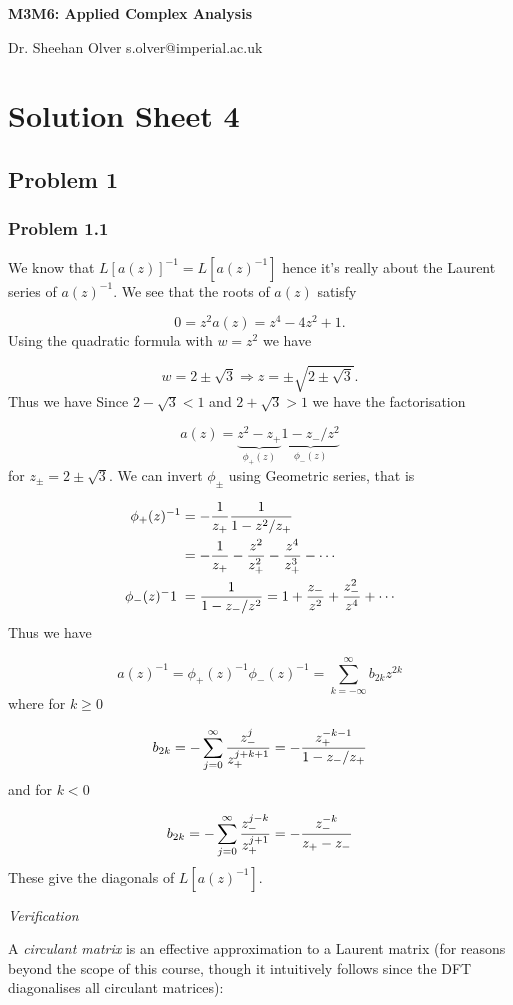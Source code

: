 \documentclass[12pt,a4paper]{article}
\def\addtab#1={#1\;&=}
\def\ccr{\\\addtab}
\def\addtab#1={#1\;&=}
\def\ccr{\\\addtab}
\begin{document}
\textbf{M3M6: Applied Complex Analysis}

Dr. Sheehan Olver s.olver@imperial.ac.uk

\section{Solution Sheet 4}
\subsection{Problem 1}
\subsubsection{Problem 1.1}
We know that $L[a(z)]^{-1} = L[a(z)^{-1}]$ hence it's really about the Laurent series of $a(z)^{-1}$. We see that the roots of $a(z)$ satisfy

\[
0 =z^2 a(z) = z^4 - 4z^2 + 1.
\]
Using the quadratic formula with $w = z^2$ we have

\[
w = 2 \pm \sqrt 3 \Rightarrow z = \pm \sqrt{2 \pm \sqrt 3}.
\]
Thus we have Since $2 - \sqrt 3 < 1$ and $2 + \sqrt 3 > 1$ we have the factorisation

\[
a(z) = \underbrace{z^2 - z_+}_{\phi_+(z)} \underbrace{1 - z_-/z^2}_{\phi_-(z)}
\]
for $z_{\pm} = 2 \pm \sqrt3$. We can invert $\phi_\pm$ using Geometric series, that is


\begin{align*}
\phi_+(z)^{-1} &= -{1 \over z_+} {1 \over 1 - z^2/z_+}  \ccr
= -{1 \over z_+} - {z^2 \over z_+^2} - {z^4 \over z_+^3} - \cdots \ccr
\phi_-(z)^{-1} = {1 \over 1- z_- /z^2} = 1 + {z_- \over z^2} + {z_-^2 \over z^4} + \cdots
\end{align*}
Thus we have

\[
a(z)^{-1} = \phi_+(z)^{-1} \phi_-(z)^{-1} =  \sum_{k=-\infty}^\infty b_{2k} z^{2k}
\]
where for $k \geq 0$

\[
b_{2k} =- \sum_{j=0}^\infty {z_-^j \over z_+^{j+k+1}} = - {z_+^{-k-1} \over 1 - z_-/z_+}
\]
and for $k < 0$

\[
b_{2k} =- \sum_{j=0}^\infty {z_-^{j-k} \over z_+^{j+1}} = - {z_-^{-k} \over z_+ - z_-}
\]
These give the diagonals of $L[a(z)^{-1}]$.

\emph{Verification}

A \emph{circulant matrix} is an effective approximation to a Laurent matrix (for reasons beyond the scope of this course, though it intuitively follows since the DFT diagonalises all circulant matrices):
\end{document}
